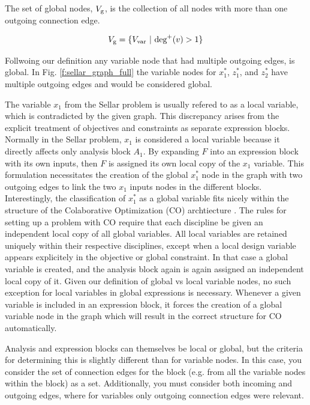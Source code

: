   The set of global nodes, $V_\textrm{g}$, is the collection of all nodes with more than 
  one outgoing connection edge. 

  \begin{equation}
    V_{\textrm{g}} = \{V_{\textrm{var}} \ | \  \textrm{deg}^+(v)>1\}
    \label{e:global_definition}
  \end{equation}

  Follwoing our definition any variable node that had multiple 
  outgoing edges, is global. In Fig. \ref{f:sellar_graph_full} 
  the variable nodes for $x_1^*$, $z_1^*$, and $z_2^*$ have multiple outgoing 
  edges and would be considered global. 

  The variable $x_1$ from the Sellar problem is usually refered to as 
  a local variable, which is contradicted by the given graph. This discrepancy 
  arises from the explicit treatment of objectives and constraints as separate 
  expression blocks. Normally in the Sellar problem, $x_1$ is considered a local 
  variable because it directly affects only analysis block $A_1$. By expanding
  $F$ into an expression block with its own inputs, then $F$ is assigned its own local 
  copy of the $x_1$ variable. This formulation necessitates the creation of the global $x_1^*$ 
  node in the graph with two outgoing edges to link the two $x_1$ inputs nodes 
  in the different blocks. Interestingly, the classification of $x_1^*$ 
  as a global variable fits nicely within the structure of the Colaborative 
  Optimization (CO) archtiecture \cite{braun1996thesis}. The rules for setting up 
  a problem with CO require that each discipline be given an independent local 
  copy of all global variables. All local variables are retained uniquely 
  within their respective disciplines, except when a local design variable appears 
  explicitely in the objective or global constraint. In that case a global 
  variable is created, and the analysis block again is again assigned an 
  independent local copy of it. Given our definition of global vs local variable 
  nodes, no such exception for local variables in global expressions is 
  necessary. Whenever a given variable is included in an expression block, 
  it forces the creation of a global variable node in the graph which will 
  result in the correct structure for CO automatically. 

  Analysis and expression blocks can themselves be local or global, but the 
  criteria for determining this is slightly different than for variable nodes. 
  In this case, you consider the set of connection edges for the block
  (e.g. from all the variable nodes within the block) as a set. Additionally, 
  you must consider both incoming and outgoing edges, where for variables 
  only outgoing connection edges were relevant. 

